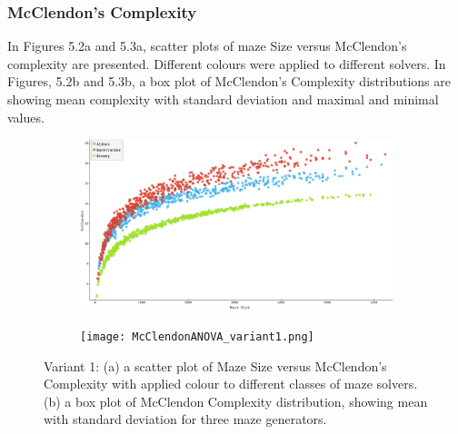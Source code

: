       \subsubsection{McClendon's Complexity}
In Figures 5.2a and 5.3a, scatter plots of maze Size versus McClendon's complexity are presented. Different colours were applied to different solvers.
In Figures, 5.2b and 5.3b, a box plot of McClendon's Complexity distributions are showing mean complexity with standard deviation and maximal and minimal values.
    \begin{figure}[!h]
        \centering
        \begin{subfigure}[!h]{0.4\textwidth}
           \includegraphics[scale = 0.15]{McClendonVsSize_variant1.png}
           \caption{}
        \end{subfigure}
        
        \begin{subfigure}[!h]{0.5\textwidth}
           \texttt{[image: McClendonANOVA\_variant1.png]}
           \caption{}
        \end{subfigure}
        \caption{Variant 1: (a) a scatter plot of Maze Size versus McClendon's Complexity with applied colour to different classes of maze solvers.
         (b) a box plot of McClendon Complexity distribution, showing mean with standard deviation for three maze generators.}
        \end{figure}%
